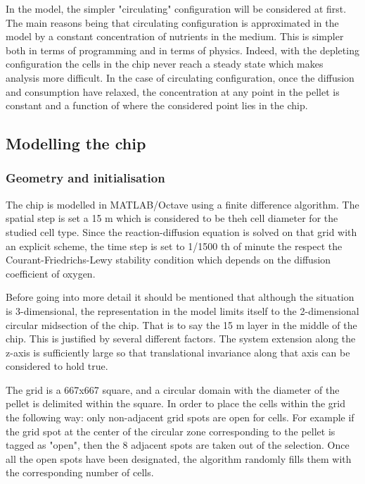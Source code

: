 \documentclass[11pt,a4paper]{article}
\begin{document}
In the model, the simpler "circulating" configuration will be considered at first. The main reasons being that circulating configuration is approximated in the model by a constant concentration of nutrients in the medium. This is simpler both in terms of programming and in terms of physics. Indeed, with the depleting configuration the cells in the chip never reach a steady state which makes analysis more difficult. In the case of circulating configuration, once the diffusion and consumption have relaxed, the concentration at any point in the pellet is constant and a function of where the considered point lies in the chip.

\subsection{Modelling the chip}
\subsubsection{Geometry and initialisation}
The chip is modelled in MATLAB/Octave using a finite difference algorithm. The spatial step is set a 15 \textmu m which is considered to be theh cell diameter for the studied cell type. Since the reaction-diffusion equation is solved on that grid with an explicit scheme, the time step is set to 1/1500 th of minute the respect the Courant-Friedrichs-Lewy stability condition which depends on the diffusion coefficient of oxygen.\cite{Press1992}

Before going into more detail it should be mentioned that although the situation is 3-dimensional, the representation in the model limits itself to the 2-dimensional circular midsection of the chip. That is to say the 15 \textmu m layer in the middle of the chip. This is justified by several different factors. The system extension along the z-axis is sufficiently large so that translational invariance along that axis can be considered to hold true.  

The grid is a 667x667 square, and a circular domain with the diameter of the pellet is delimited within the square. In order to place the cells within the grid the following way: only non-adjacent grid spots are open for cells. For example if the grid spot at the center of the circular zone corresponding to the pellet is tagged as "open", then the 8 adjacent spots are taken out of the selection. Once all the open spots have been designated, the algorithm randomly fills them with the corresponding number of cells.
\end{document}
